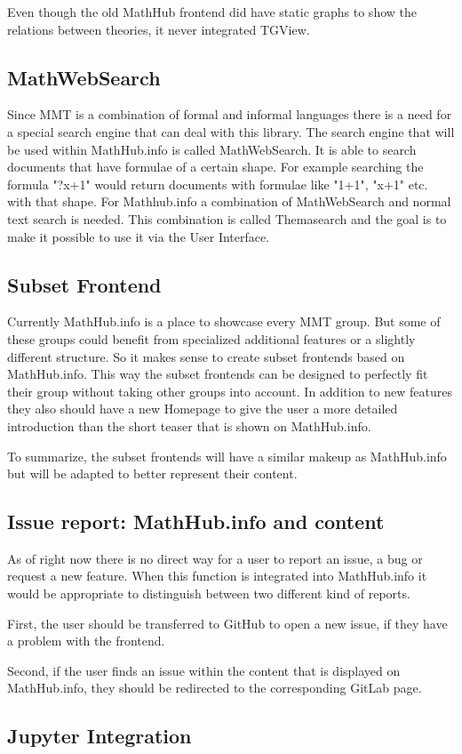 \documentclass[11pt,a4paper]{article}
\begin{document}
Even though the old MathHub frontend did have static graphs to show the relations between theories, it never integrated TGView.
 
\subsection{MathWebSearch}
Since MMT is a combination of formal and informal languages there is a need for a special search engine that can deal with this library.
The search engine that will be used within MathHub.info is called MathWebSearch\cite{HamKoh:fsfm15}.
It is able to search documents that have formulae of a certain shape.
For example searching the formula "?x+1" would return documents with formulae like "1+1", "x+1" etc. with that shape.
For Mathhub.info a combination of MathWebSearch and normal text search is needed.
This combination is called Themasearch and the goal is to make it possible to use it via the User Interface.

\subsection{Subset Frontend}
Currently MathHub.info is a place to showcase every MMT group.
But some of these groups could benefit from specialized additional features or a slightly different structure.
So it makes sense to create subset frontends based on MathHub.info.
This way the subset frontends can be designed to perfectly fit their group without taking other groups into account.
In addition to new features they also should have a new Homepage to give the user a more detailed introduction than the short teaser that is shown on MathHub.info.

To summarize, the subset frontends will have a similar makeup as MathHub.info but will be adapted to better represent their content.

\subsection{Issue report: MathHub.info and content}
As of right now there is no direct way for a user to report an issue, a bug or request a new feature.
When this function is integrated into MathHub.info it would be appropriate to distinguish between two different kind of reports.

First, the user should be transferred to GitHub to open a new issue, if they have a problem with the frontend.

Second, if the user finds an issue within the content that is displayed on MathHub.info, they should be redirected to the corresponding GitLab page. 
\subsection{Jupyter Integration}

\printbibliography
{}
\end{document}
